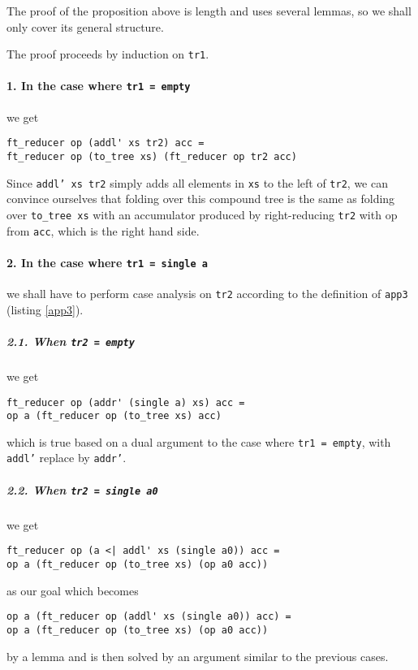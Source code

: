 \documentclass{article}
\newcommand{\code}[1]{\texttt{#1}}
\begin{document}
The proof of the proposition above is length and uses several lemmas, so
we shall only cover its general structure.

The proof proceeds by induction on \code{tr1}.

\paragraph*{1. In the case where \code{tr1 = empty}} we get
\begin{verbatim}
ft_reducer op (addl' xs tr2) acc =
ft_reducer op (to_tree xs) (ft_reducer op tr2 acc)
\end{verbatim}

Since \code{addl' xs tr2} simply adds all elements in \code{xs} to the
left of \code{tr2}, we can convince ourselves that folding over this
compound tree is the same as folding over \code{to\_tree xs} with
an accumulator produced by right-reducing \code{tr2} with op from \code{acc},
which is the right hand side.

\paragraph*{2. In the case where \code{tr1 = single a}} we shall have to
perform case analysis on \code{tr2} according to the definition of \code{app3}
(listing \ref{app3}).

\subparagraph{2.1. When \code{tr2 = empty}} we get
\begin{verbatim}
ft_reducer op (addr' (single a) xs) acc =
op a (ft_reducer op (to_tree xs) acc)
\end{verbatim}

which is true based on a dual argument to the case where \code{tr1 = empty},
with \code{addl'} replace by \code{addr'}.

\subparagraph{2.2. When \code{tr2 = single a0}} we get

\begin{verbatim}
ft_reducer op (a <| addl' xs (single a0)) acc =
op a (ft_reducer op (to_tree xs) (op a0 acc))
\end{verbatim}

as our goal which becomes
\begin{verbatim}
op a (ft_reducer op (addl' xs (single a0)) acc) =
op a (ft_reducer op (to_tree xs) (op a0 acc))
\end{verbatim}

by a lemma and is then solved by an argument similar to the previous cases.
\end{document}
